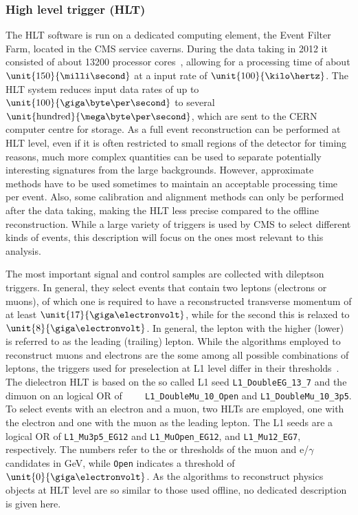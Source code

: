 \subsubsection*{High level trigger (HLT)}
The HLT software is run on a dedicated computing element, the Event Filter Farm, located in the CMS service caverns. During the data taking in 2012 it consisted of about 13200 processor cores~\cite{HLTProceedings}, allowing for a processing time of about $\unit{150}{\milli\second}$ at a input rate of $\unit{100}{\kilo\hertz}$. The HLT system reduces input data rates of up to $\unit{100}{\giga\byte\per\second}$ to several $\unit{\text{hundred}}{\mega\byte\per\second}$, which are sent to the CERN computer centre for storage. As a full event reconstruction can be performed at HLT level, even if it is often restricted to small regions of the detector for timing reasons, much more complex quantities can be used to separate potentially interesting signatures from the large backgrounds. However, approximate methods have to be used sometimes to maintain an acceptable processing time per event. Also, some calibration and alignment methods can only be performed after the data taking, making the HLT less precise compared to the offline reconstruction. While a large variety of triggers is used by CMS to select different kinds of events, this description will focus on the ones most relevant to this analysis. 

The most important signal and control samples are collected with dileptson triggers. In general, they select events that contain two leptons (electrons or muons), of which one is required to have a reconstructed transverse momentum \pt of at least $\unit{17}{\giga\electronvolt}$, while for the second this is relaxed to $\unit{8}{\giga\electronvolt}$. In general, the lepton with the higher (lower) \pt is referred to as the leading (trailing) lepton. While the algorithms employed to reconstruct muons and electrons are the some among all possible combinations of leptons, the triggers used for preselection at L1 level differ in their thresholds~\cite{HLTConfigBrowser}. The dielectron HLT is based on the so called L1 seed \verb+L1_DoubleEG_13_7+ and the dimuon on an logical OR of \verb+	L1_DoubleMu_10_Open+ and \verb+L1_DoubleMu_10_3p5+. To select events with an electron and a muon, two HLTs are employed, one with the electron and one with the muon as the leading lepton. The L1 seeds are a logical OR of \verb+L1_Mu3p5_EG12+ and \verb+L1_MuOpen_EG12+, and \verb+L1_Mu12_EG7+, respectively. The numbers refer to the \pt or \Et thresholds of the muon and e/$\gamma$ candidates in GeV, while \verb+Open+ indicates a threshold of $\unit{0}{\giga\electronvolt}$. As the algorithms to reconstruct physics objects at HLT level are so similar to those used offline, no dedicated description is given here.

  


